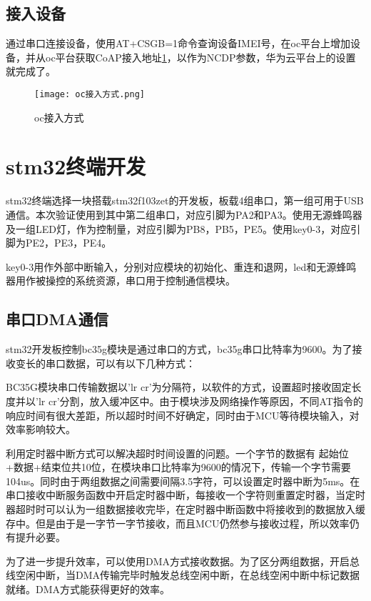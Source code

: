 \subsection{接入设备}
通过串口连接设备，使用AT+CSGB=1命令查询设备IMEI号，在oc平台上增加设备，并从oc平台获取CoAP接入地址\ref{oc接入方式}，以作为NCDP参数，华为云平台上的设置就完成了。
\begin{figure}[h]
	\texttt{[image: oc接入方式.png]}
	\caption{oc接入方式}
	\label{oc接入方式}
\end{figure}


\section{stm32终端开发}
stm32终端选择一块搭载stm32f103zet的开发板，板载4组串口，第一组可用于USB通信。本次验证使用到其中第二组串口，对应引脚为PA2和PA3。使用无源蜂鸣器及一组LED灯，作为控制量，对应引脚为PB8，PB5，PE5。使用key0-3，对应引脚为PE2，PE3，PE4。

key0-3用作外部中断输入，分别对应模块的初始化、重连和退网，led和无源蜂鸣器用作被操控的系统资源，串口用于控制通信模块。


\subsection{串口DMA通信}

stm32开发板控制bc35g模块是通过串口的方式，bc35g串口比特率为9600。为了接收变长的串口数据，可以有以下几种方式：

BC35G模块串口传输数据以'lr cr'为分隔符，以软件的方式，设置超时接收固定长度并以'lr cr'分割，放入缓冲区中。由于模块涉及网络操作等原因，不同AT指令的响应时间有很大差距，所以超时时间不好确定，同时由于MCU等待模块输入，对效率影响较大。

利用定时器中断方式可以解决超时时间设置的问题。一个字节的数据有 起始位+数据+结束位共10位，在模块串口比特率为9600的情况下，传输一个字节需要104us。同时由于两组数据之间需要间隔3.5字符，可以设置定时器中断为5ms。在串口接收中断服务函数中开启定时器中断，每接收一个字符则重置定时器，当定时器超时时可以认为一组数据接收完毕，在定时器中断函数中将接收到的数据放入缓存中。但是由于是一字节一字节接收，而且MCU仍然参与接收过程，所以效率仍有提升必要。

为了进一步提升效率，可以使用DMA方式接收数据。为了区分两组数据，开启总线空闲中断，当DMA传输完毕时触发总线空闲中断，在总线空闲中断中标记数据就绪。DMA方式能获得更好的效率。

